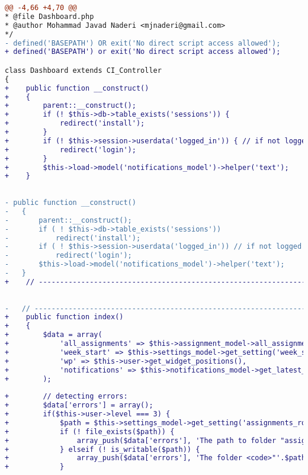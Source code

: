 \begin{lstlisting}[language=diff, basicstyle=\ttfamily, frame=single,
	columns=fullflexible, keepspaces=true, breaklines=true, label=ck:31, caption=Contoh penggunaan PHP CS Fixer pada \textit{Dashboard.php}]
@@ -4,66 +4,70 @@
* @file Dashboard.php
* @author Mohammad Javad Naderi <mjnaderi@gmail.com>
*/
- defined('BASEPATH') OR exit('No direct script access allowed');
+ defined('BASEPATH') or exit('No direct script access allowed');

class Dashboard extends CI_Controller
{
+    public function __construct()
+    {
+        parent::__construct();
+        if (! $this->db->table_exists('sessions')) {
+            redirect('install');
+        }
+        if (! $this->session->userdata('logged_in')) { // if not logged in
+            redirect('login');
+        }
+        $this->load->model('notifications_model')->helper('text');
+    }
	
	
- public function __construct()
-	{
-		parent::__construct();
-		if ( ! $this->db->table_exists('sessions'))
-			redirect('install');
-		if ( ! $this->session->userdata('logged_in')) // if not logged in
-			redirect('login');
-		$this->load->model('notifications_model')->helper('text');
-	}
+    // ------------------------------------------------------------------------
	
	
-	// ------------------------------------------------------------------------
+    public function index()
+    {
+        $data = array(
+            'all_assignments' => $this->assignment_model->all_assignments(),
+            'week_start' => $this->settings_model->get_setting('week_start'),
+            'wp' => $this->user->get_widget_positions(),
+            'notifications' => $this->notifications_model->get_latest_notifications()
+        );
		
+        // detecting errors:
+        $data['errors'] = array();
+        if($this->user->level === 3) {
+            $path = $this->settings_model->get_setting('assignments_root');
+            if (! file_exists($path)) {
+                array_push($data['errors'], 'The path to folder "assignments" is not set correctly. Move this folder somewhere not publicly accessible, and set its full path in Settings.');
+            } elseif (! is_writable($path)) {
+                array_push($data['errors'], 'The folder <code>"'.$path.'"</code> is not writable by PHP. Make it writable. But make sure that this folder is only accessible by you. Codes will be saved in this folder!');
+            }
			

\end{lstlisting}
